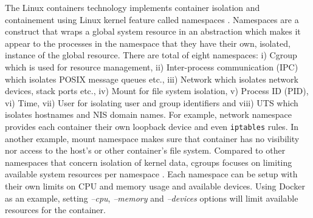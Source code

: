 \documentclass[english, 12pt, a4paper, sci, utf8, a-2b, online]{aaltothesis}
\begin{document}
The Linux containers technology implements container isolation and containement using Linux kernel feature called namespaces \cite{lin2018measurement}. Namespaces \cite{manpages-namespace} are a construct that wraps a global system resource in an abstraction which makes it appear to the processes in the namespace that they have their own, isolated, instance of the global resource. There are total of eight namespaces: i) Cgroup which is used for resource management, ii) Inter-process communication (IPC) which isolates POSIX message queues etc., iii) Network which isolates network devices, stack ports etc., iv) Mount for file system isolation, v) Process ID (PID), vi) Time, vii) User for isolating user and group identifiers and viii) UTS which isolates hostnames and NIS domain names. For example, network namespace provides each container their own loopback device and even \texttt{iptables} rules. In another example, mount namespace makes sure that container has no visibility nor access to the host's or other container's file system. Compared to other namespaces that concern isolation of kernel data, cgroups focuses on limiting available system resources per namespace \cite{lin2018measurement}. Each namespace can be setup with their own limits on CPU and memory usage and available devices. Using Docker as an example, setting \textit{--cpu}, \textit{--memory} and \textit{--devices} options will limit available resources for the container.

\end{document}
